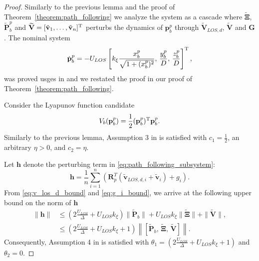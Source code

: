 \begin{proof}
    Similarly to the previous lemma and the proof of Theorem~\ref{theorem:path_following} we analyze the system as a cascade where $\widetilde{\bm{\Xi}}$, $\widetilde{\mathbf{P}}_b^p$ and $\widetilde{\mathbf{V}} = [\tilde{\mathbf{v}}_1, \ldots, \tilde{\mathbf{v}}_n]^{\rm T}$ perturbs the dynamics of $\mathbf{p}_b^p$ through $\widetilde{\mathbf{V}}_{LOS,d}$, $\widetilde{\mathbf{V}}$ and $\mathbf{G}$. The nominal system
    \begin{equation}
        \dot{\mathbf{p}}_b^p = - U_{LOS} \left[k_\xi\frac{x_{b}^p}{\sqrt{1 + (x_{b}^p)^2}},\, \frac{y_b^p}{D},\, \frac{z_b^p}{D} \right]^{\rm T},
    \end{equation}
    was proved \gls{usges} in \cite{matous_singularity-free_2022} and we restated the proof in our proof of Theorem~\ref{theorem:path_following}.

    Consider the Lyapunov function candidate
    \begin{equation}
        V_b(\mathbf{p}_b^p) = \frac{1}{2} (\mathbf{p}_b^p)^{\rm T} \mathbf{p}_b^p.
    \end{equation}
    Similarly to the previous lemma, Assumption 3 in \cite[Theorem 2.1]{lamnabhi-lagarrigue_2_2005} is satisfied with $c_1 = \tfrac{1}{2}$, an arbitrary $\eta > 0$, and $c_2 = \eta$.

    Let $\mathbf{h}$ denote the perturbing term in \eqref{eq:path_following_subsystem}:
    \begin{equation}
        \mathbf{h} = \frac{1}{n}\sum_{i=1}^n \left(\mathbf{R}_p^T(\widetilde{\mathbf{v}}_{LOS,d,i} + \widetilde{\mathbf{v}}_i) + g_i\right).
    \end{equation}
    From \eqref{eq:v_los_d_bound} and \eqref{eq:g_i_bound}, we arrive at the following upper bound on the norm of $\mathbf{h}$
    \begin{equation}
    \begin{split}
        \|\mathbf{h}\| &\leq \left(2 \frac{U_{LOS}}{\Delta} + U_{LOS}k_\xi\right) \|\widetilde{\mathbf{P}}_b\| + U_{LOS}k_\xi \|\widetilde{\bm{\Xi}}\| + \|\widetilde{\mathbf{V}}\|,\\
        &\leq  \left(2 \frac{U_{LOS}}{\Delta} + U_{LOS}k_\xi +1\right)\left \| \left[\widetilde{\mathbf{P}}_b,\, \widetilde{\bm{\Xi}},\, \widetilde{\mathbf{V}} \right]\right\|.
    \end{split}
    \end{equation}
    Consequently, Assumption 4 in \cite[Theorem 2.1]{lamnabhi-lagarrigue_2_2005} is satisfied with $\theta_1 = (2 \frac{U_{LOS}}{\Delta} + U_{LOS}k_\xi +1)$ and $\theta_2 = 0$.


\end{proof}
